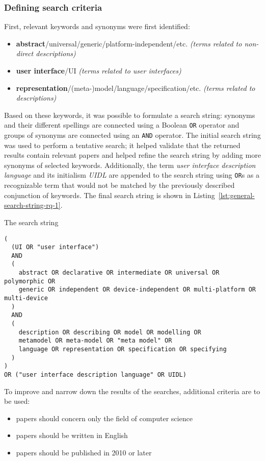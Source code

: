 \subsubsection{Defining search criteria}
First, relevant keywords and synonyms were first identified:
\begin{itemize}
    \item \textbf{abstract}/universal/generic/platform-independent/etc. \textit{(terms related to non-direct descriptions)}
    \item \textbf{user interface}/UI \textit{(terms related to user interfaces)}
    \item \textbf{representation}/(meta-)model/language/specification/etc. \textit{(terms related to descriptions)}
\end{itemize}
Based on these keywords, it was possible to formulate a search string: synonyms and their different spellings are connected using a Boolean \texttt{OR} operator and groups of synonyms are connected using an \texttt{AND} operator.
The initial search string was used to perform a tentative search;
it helped validate that the returned results contain relevant papers and helped refine the search string by adding more synonyms of selected keywords.
Additionally, the term \emph{user interface description language} and its initialism \emph{UIDL} are appended to the search string using \texttt{OR}s as a recognizable term that would not be matched by the previously described conjunction of keywords.
The final search string is shown in Listing~\ref{lst:general-search-string-rq-1}.
\begin{listing}
    \caption{The search string}
    \begin{verbatim}
(
  (UI OR "user interface")
  AND
  (
    abstract OR declarative OR intermediate OR universal OR polymorphic OR
    generic OR independent OR device-independent OR multi-platform OR multi-device
  )
  AND
  (
    description OR describing OR model OR modelling OR
    metamodel OR meta-model OR "meta model" OR
    language OR representation OR specification OR specifying
  )
)
OR ("user interface description language" OR UIDL)
    \end{verbatim}
    \label{lst:general-search-string-rq-1}
\end{listing}

To improve and narrow down the results of the searches, additional criteria are to be used:
\begin{itemize}
    \item papers should concern only the field of computer science
    \item papers should be written in English
    \item papers should be published in 2010 or later
\end{itemize}

